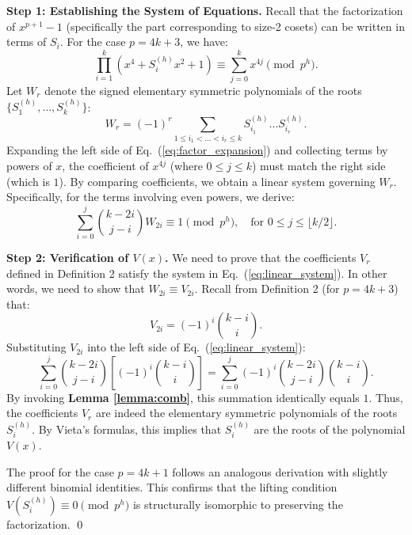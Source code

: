 \documentclass[12pt]{article}
\theoremstyle{plain}
\numberwithin{equation}{section}
\begin{document}
\begin{appendix}
\textbf{Step 1: Establishing the System of Equations.}
Recall that the factorization of $x^{p+1}-1$ (specifically the part corresponding to size-2 cosets) can be written in terms of $S_i$. For the case $p = 4k+3$, we have:
\begin{equation}
    \prod_{i=1}^k (x^4 + S_i^{(h)} x^2 + 1) \equiv \sum_{j=0}^k x^{4j} \pmod{p^h}.
    \label{eq:factor_expansion}
\end{equation}
Let $W_r$ denote the signed elementary symmetric polynomials of the roots $\{S_1^{(h)}, \dots, S_k^{(h)}\}$:
\begin{equation}
    W_r = (-1)^r \sum_{1 \le i_1 < \dots < i_r \le k} S_{i_1}^{(h)} \dots S_{i_r}^{(h)}.
\end{equation}
Expanding the left side of Eq.~(\ref{eq:factor_expansion}) and collecting terms by powers of $x$, the coefficient of $x^{4j}$ (where $0 \le j \le k$) must match the right side (which is $1$). By comparing coefficients, we obtain a linear system governing $W_r$. Specifically, for the terms involving even powers, we derive:
\begin{equation}
    \sum_{i=0}^j \binom{k-2i}{j-i} W_{2i} \equiv 1 \pmod{p^h}, \quad \text{for } 0 \le j \le \lfloor k/2 \rfloor.
    \label{eq:linear_system}
\end{equation}

\textbf{Step 2: Verification of $V(x)$.}
We need to prove that the coefficients $V_r$ defined in Definition 2 satisfy the system in Eq.~(\ref{eq:linear_system}). In other words, we need to show that $W_{2i} \equiv V_{2i}$.
Recall from Definition 2 (for $p=4k+3$) that:
\begin{equation}
    V_{2i} = (-1)^i \binom{k-i}{i}.
\end{equation}
Substituting $V_{2i}$ into the left side of Eq.~(\ref{eq:linear_system}):
\begin{equation}
    \sum_{i=0}^j \binom{k-2i}{j-i} \left[ (-1)^i \binom{k-i}{i} \right] = \sum_{i=0}^j (-1)^i \binom{k-2i}{j-i} \binom{k-i}{i}.
\end{equation}
By invoking \textbf{Lemma \ref{lemma:comb}}, this summation identically equals $1$.
Thus, the coefficients $V_r$ are indeed the elementary symmetric polynomials of the roots $S_i^{(h)}$. By Vieta's formulas, this implies that $S_i^{(h)}$ are the roots of the polynomial $V(x)$.

The proof for the case $p=4k+1$ follows an analogous derivation with slightly different binomial identities. This confirms that the lifting condition $V(S_i^{(h)}) \equiv 0 \pmod{p^h}$ is structurally isomorphic to preserving the factorization. \qed




\end{appendix}
\end{document}
